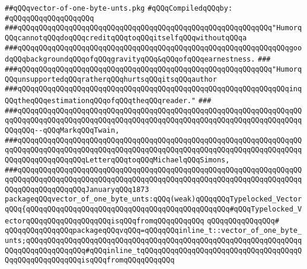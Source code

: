 \label{src/lib/std/src/vector-of-one-byte-unts.pkg}
\verb|##qQQqvector-of-one-byte-unts.pkg|\newline
\newline
\verb|#qQQqCompiledqQQqby:|\newline
\verb|#qQQqqQQqqQQqqQQqqQQq|\newline
\newline
\verb|###qQQqqQQqqQQqqQQqqQQqqQQqqQQqqQQqqQQqqQQqqQQqqQQqqQQqqQQqqQQq"HumorqQQqcannotqQQqdoqQQqcreditqQQqtoqQQqitselfqQQqwithoutqQQqa|\newline
\verb|###qQQqqQQqqQQqqQQqqQQqqQQqqQQqqQQqqQQqqQQqqQQqqQQqqQQqqQQqqQQqqQQqgoodqQQqbackgroundqQQqofqQQqgravityqQQq&qQQqofqQQqearnestness.|\newline
\verb|###|\newline
\verb|###qQQqqQQqqQQqqQQqqQQqqQQqqQQqqQQqqQQqqQQqqQQqqQQqqQQqqQQqqQQq"HumorqQQqunsupportedqQQqratherqQQqhurtsqQQqitsqQQqauthor|\newline
\verb|###qQQqqQQqqQQqqQQqqQQqqQQqqQQqqQQqqQQqqQQqqQQqqQQqqQQqqQQqqQQqqQQqinqQQqtheqQQqestimationqQQqofqQQqtheqQQqreader."|\newline
\verb|###|\newline
\verb|###qQQqqQQqqQQqqQQqqQQqqQQqqQQqqQQqqQQqqQQqqQQqqQQqqQQqqQQqqQQqqQQqqQQqqQQqqQQqqQQqqQQqqQQqqQQqqQQqqQQqqQQqqQQqqQQqqQQqqQQqqQQqqQQqqQQqqQQqqQQqqQQq--qQQqMarkqQQqTwain,|\newline
\verb|###qQQqqQQqqQQqqQQqqQQqqQQqqQQqqQQqqQQqqQQqqQQqqQQqqQQqqQQqqQQqqQQqqQQqqQQqqQQqqQQqqQQqqQQqqQQqqQQqqQQqqQQqqQQqqQQqqQQqqQQqqQQqqQQqqQQqqQQqqQQqqQQqqQQqqQQqqQQqLetterqQQqtoqQQqMichaelqQQqSimons,|\newline
\verb|###qQQqqQQqqQQqqQQqqQQqqQQqqQQqqQQqqQQqqQQqqQQqqQQqqQQqqQQqqQQqqQQqqQQqqQQqqQQqqQQqqQQqqQQqqQQqqQQqqQQqqQQqqQQqqQQqqQQqqQQqqQQqqQQqqQQqqQQqqQQqqQQqqQQqqQQqqQQqJanuaryqQQq1873|\newline
\newline
\newline
\newline
\verb|packageqQQqvector_of_one_byte_unts:qQQq(weak)qQQqqQQqTypelocked_VectorqQQq{qQQqqQQqqQQqqQQqqQQqqQQqqQQqqQQqqQQqqQQqqQQqqQQq#qQQqTypelocked_VectorqQQqqQQqqQQqqQQqqQQqisqQQqfromqQQqqQQqqQQq|\newline
\verb|qQQqqQQqqQQqqQQq#|\newline
\verb|qQQqqQQqqQQqqQQqpackageqQQqvqQQq=qQQqqQQqinline_t::vector_of_one_byte_unts;qQQqqQQqqQQqqQQqqQQqqQQqqQQqqQQqqQQqqQQqqQQqqQQqqQQqqQQqqQQqqQQqqQQqqQQqqQQqqQQqqQQq#qQQqinline_tqQQqqQQqqQQqqQQqqQQqqQQqqQQqqQQqqQQqqQQqqQQqqQQqqQQqqQQqisqQQqfromqQQqqQQqqQQq|\newline

